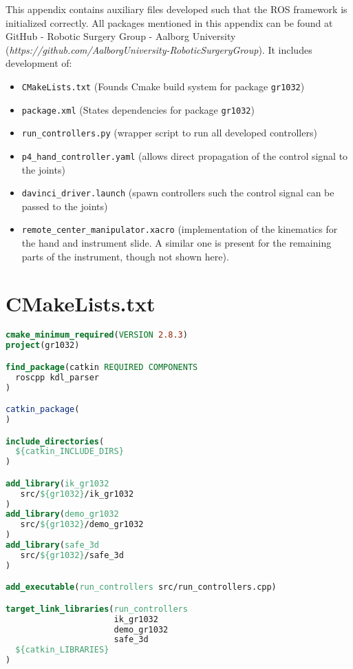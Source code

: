 This appendix contains auxiliary files developed such that the ROS framework is initialized correctly. All packages mentioned in this appendix can be found at GitHub - Robotic Surgery Group - Aalborg University (\textit{https://github.com/AalborgUniversity-RoboticSurgeryGroup}). It includes development of:
\begin{itemize}
\item \texttt{CMakeLists.txt} (Founds Cmake build system for package \texttt{gr1032})
\item \texttt{package.xml} (States dependencies for package \texttt{gr1032})
\item \texttt{run\_controllers.py} (wrapper script to run all developed controllers)
\item \texttt{p4\_hand\_controller.yaml} (allows direct propagation of the control signal to the joints)
\item \texttt{davinci\_driver.launch} (spawn controllers such the control signal can be passed to the joints)
\item \texttt{remote\_center\_manipulator.xacro} (implementation of the kinematics for the hand and instrument slide. A similar one is present for the remaining parts of the instrument, though not shown here).
\end{itemize}
\section*{CMakeLists.txt}
\begin{lstlisting}[language=cmake]
cmake_minimum_required(VERSION 2.8.3)
project(gr1032)

find_package(catkin REQUIRED COMPONENTS
  roscpp kdl_parser
)

catkin_package(
)

include_directories(
  ${catkin_INCLUDE_DIRS}
)

add_library(ik_gr1032
   src/${gr1032}/ik_gr1032
)
add_library(demo_gr1032
   src/${gr1032}/demo_gr1032
)
add_library(safe_3d
   src/${gr1032}/safe_3d
)

add_executable(run_controllers src/run_controllers.cpp)

target_link_libraries(run_controllers
                      ik_gr1032
                      demo_gr1032
                      safe_3d
  ${catkin_LIBRARIES}
)
\end{lstlisting}
